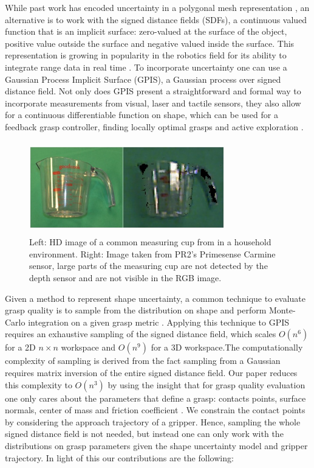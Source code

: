 \documentclass[letterpaper, 10 pt, conference]{ieeeconf}  %
\begin{document}
While past work has encoded uncertainty in a polygonal mesh representation \cite{kehoe2012estimating}, an alternative is to work with the signed distance fields (SDFs), a continuous valued function that is an implicit surface: zero-valued at the surface of the object, positive value outside the surface and negative valued inside the surface. This representation is growing in popularity in the robotics field for its ability to integrate range data in real time \cite{newcombe2011kinectfusion}\cite{curless1996volumetric}. To incorporate uncertainty one can use a Gaussian Process Implicit Surface (GPIS), a Gaussian process over signed distance field. Not only does GPIS present a straightforward and formal way to incorporate measurements from visual, laser and tactile sensors, they  also allow for a continuous differentiable function on shape, which can be used for a feedback grasp controller, finding locally optimal grasps and active exploration  \cite{dragiev2011}\cite{jeffs}\cite{hollinger2013}. 
 
\begin{figure}[ht!]
\centering
\includegraphics[width=8.5cm,height=4cm]{figures/Slide02.jpg}
\caption{\footnotesize
Left: HD image of a common measuring cup from in a household environment. Right: Image taken from PR2's Primesense Carmine sensor, large parts of the measuring cup are not detected by the depth sensor and are not visible in the RGB image.}
\vspace*{-10pt}
\label{fig:noisy data}
\end{figure}

Given a method to represent shape uncertainty, a common technique to evaluate grasp quality is to sample from the distribution on shape and perform Monte-Carlo integration on a given grasp metric \cite{kehoe2012estimating}\cite{kehoe2012toward}\cite{christopoulos2007handling}. Applying this technique to GPIS requires an exhaustive sampling of the signed distance field, which scales $O(n^6)$ for a 2D $n \times n$ workspace and $O(n^9)$ for a 3D workspace.The computationally complexity of sampling is derived from the fact sampling from a Gaussian requires matrix inversion of the entire signed distance field. Our paper reduces this complexity to $O(n^3)$ by using the insight that for grasp quality evaluation one only cares about the parameters that define a grasp: contacts points, surface normals, center of mass and friction coefficient \cite{pokorny2013classical}. We constrain the contact points by considering the approach trajectory of a gripper.  Hence, sampling the whole signed distance field is not needed, but instead one can only work with the distributions on grasp parameters given the shape uncertainty model and gripper trajectory. In light of this our contributions are the following:
 
\end{document}
